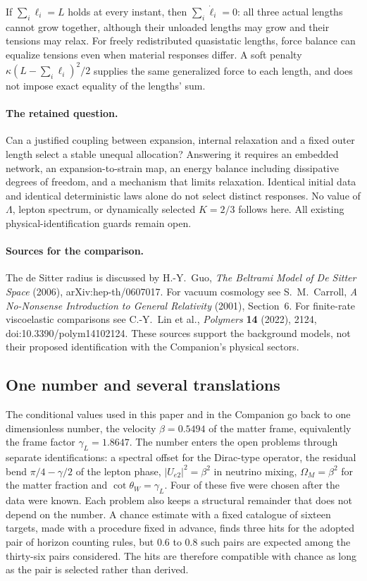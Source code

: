 If $\sum_i\ell_i=L$ holds at every instant, then
$\sum_i\dot\ell_i=0$: all three actual lengths cannot grow together,
although their unloaded lengths may grow and their tensions may relax.
For freely redistributed quasistatic lengths, force balance can equalize
tensions even when material responses differ. A soft penalty
$\kappa(L-\sum_i\ell_i)^2/2$ supplies the same generalized force to
each length, and does not impose exact equality of the lengths' sum.

\paragraph{The retained question.}
Can a justified coupling between expansion, internal relaxation and a
fixed outer length select a stable unequal allocation? Answering it
requires an embedded network, an expansion-to-strain map, an energy
balance including dissipative degrees of freedom, and a mechanism that
limits relaxation. Identical initial data and identical deterministic
laws alone do not select distinct responses. No value of $\Lambda$,
lepton spectrum, or dynamically selected $K=2/3$ follows here. All
existing physical-identification guards remain open.

\paragraph{Sources for the comparison.}
The de Sitter radius is discussed by H.-Y.~Guo,
\emph{The Beltrami Model of De Sitter Space} (2006),
arXiv:hep-th/0607017. For vacuum cosmology see S.~M.~Carroll,
\emph{A No-Nonsense Introduction to General Relativity} (2001),
Section~6. For finite-rate viscoelastic comparisons see C.-Y.~Lin
et al., \emph{Polymers} \textbf{14} (2022), 2124,
doi:10.3390/polym14102124. These sources support the background models,
not their proposed identification with the Companion's physical sectors.

\subsection{One number and several translations}

The conditional values used in this paper and in the Companion go back
to one dimensionless number, the velocity $\beta=0.5494$ of the matter
frame, equivalently the frame factor $\gamma_L=1.8647$. The number
enters the open problems through separate identifications: a spectral
offset for the Dirac-type operator, the residual bend
$\pi/4-\gamma/2$ of the lepton phase, $|U_{e2}|^2=\beta^2$ in neutrino
mixing, $\Omega_M=\beta^2$ for the matter fraction and
$\operatorname{cot}\theta_W=\gamma_L$. Four of these five were chosen after the data
were known. Each problem also keeps a structural remainder that does not
depend on the number. A chance estimate with a fixed catalogue of
sixteen targets, made with a procedure fixed in advance, finds three
hits for the adopted pair of horizon counting rules, but $0.6$ to $0.8$
such pairs are expected among the thirty-six pairs considered. The hits
are therefore compatible with chance as long as the pair is selected
rather than derived.

